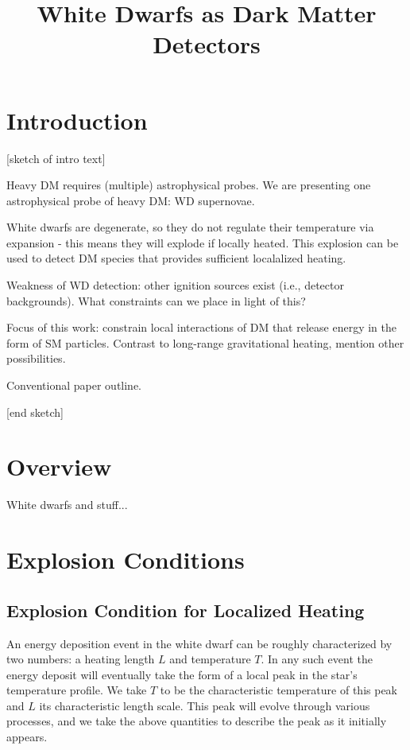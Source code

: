 \documentclass[11 pt,preprint,preprintnumbers,amsmath,amssymb, prd]{revtex4}
\begin{document}
\title{White Dwarfs as Dark Matter Detectors}
\maketitle

\section{Introduction}

{\color{blue} [sketch of intro text]

Heavy DM requires (multiple) astrophysical probes.
We are presenting one astrophysical probe of heavy DM: WD supernovae. 

White dwarfs are degenerate, so they do not regulate their temperature via expansion - this means they will explode if locally heated.  This explosion can be used to detect DM species that provides sufficient localalized heating. 

Weakness of WD detection: other ignition sources exist (i.e., detector backgrounds). What constraints can we place in light of this?

Focus of this work: constrain local interactions of DM that release energy in the form of SM particles. Contrast to long-range gravitational heating, mention other possibilities. 

Conventional paper outline. 

[end sketch]}

\section{Overview}

White dwarfs and stuff...

\section{Explosion Conditions}

\subsection{Explosion Condition for Localized Heating}

An energy deposition event in the white dwarf can be roughly characterized by two numbers: a heating length $L$ and temperature $T$.  In any such event the energy deposit will eventually take the form of a local peak in the star's temperature profile.  We take $T$ to be the characteristic temperature of this peak and $L$ its characteristic length scale.  This peak will evolve through various processes, and we take the above quantities to describe the peak as it initially appears.  
\end{document}

